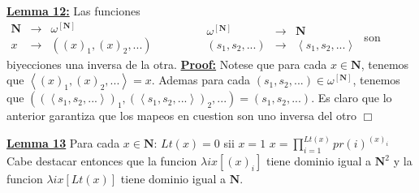   \textbf{\underline{Lemma 12:}} Las funciones
\(\displaystyle \begin{array}{lll} \mathbf{N} & \rightarrow & \omega ^{\left[ \mathbf{N}\right] } \\ x & \rightarrow & ((x)_{1},(x)_{2},...) \end{array} \ \ \ \ \ \ \ \ \ \ \ \ \ \ \ \ \ \ \begin{array}{rll} \omega ^{\left[ \mathbf{N}\right] } & \rightarrow & \mathbf{N} \\ (s_{1},s_{2},...) & \rightarrow & \left\langle s_{1},s_{2},...\right\rangle \end{array} \)
son biyecciones una inversa de la otra.
\textbf{\underline{Proof:}} Notese que para cada \(x\in \mathbf{N}\), tenemos que \(\left\langle (x)_{1},(x)_{2},...\right\rangle =x\). Ademas para cada \((s_{1},s_{2},...)\in \omega ^{\left[ \mathbf{N}\right] }\), tenemos que \(((\left\langle s_{1},s_{2},...\right\rangle )_{1},(\left\langle s_{1},s_{2},...\right\rangle )_{2},...)=(s_{1},s_{2},...)\). Es claro que lo anterior garantiza que los mapeos en cuestion son uno inversa del otro \(\Box\)

  \textbf{\underline{Lemma 13}} Para cada \(x\in \mathbf{N}\):
\(Lt(x)=0\) sii \(x=1\)
\(x=\prod\nolimits_{i=1}^{Lt(x)}pr(i)^{(x)_{i}}\)
Cabe destacar entonces que la funcion \(\lambda ix[(x)_{i}]\) tiene dominio igual a \(\mathbf{N}^{2}\) y la funcion \(\lambda ix[Lt(x)]\) tiene dominio igual a \(\mathbf{N}\).
